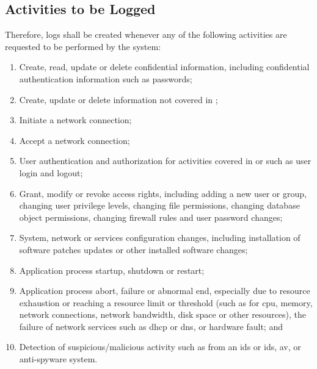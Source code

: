 \subsection{Activities to be Logged}
Therefore, logs shall be created whenever any of the following activities are requested to be performed by the system:
\begin{enumerate}
\item\label{SS:ILS:S:AtbL:1}
Create, read, update\oxford{} or delete confidential information, including confidential authentication information such as passwords;
\item\label{SS:ILS:S:AtbL:2}
Create, update\oxford{} or delete information not covered in ;%
\item
Initiate a network connection;
\item
Accept a network connection;
\item
User authentication and authorization for activities covered in  or  such as user login and logout;%
\item
Grant, modify\oxford{} or revoke access rights, including adding a new user or group, changing user privilege levels, changing file permissions, changing database object permissions, changing firewall rules\oxford{} and user password changes;
\item
System, network\oxford{} or services configuration changes, including installation of software patches updates\oldnew{,}{\oxford} or other installed software changes;
\item
Application process startup, shutdown\oxford{} or restart;
\item
Application process abort, failure\oxford{} or abnormal end, especially due to resource exhaustion or reaching a resource limit or threshold (such as for \gls{cpu}, memory, network connections, network bandwidth, disk space\oxford{} or other resources), the failure of network services such as \gls{dhcp} or \gls{dns}, or hardware fault; and
\item
Detection of suspicious/malicious activity such as from an \gls{ids} or \gls{ids}, \gls{av}, or anti-spyware system.
\end{enumerate}
